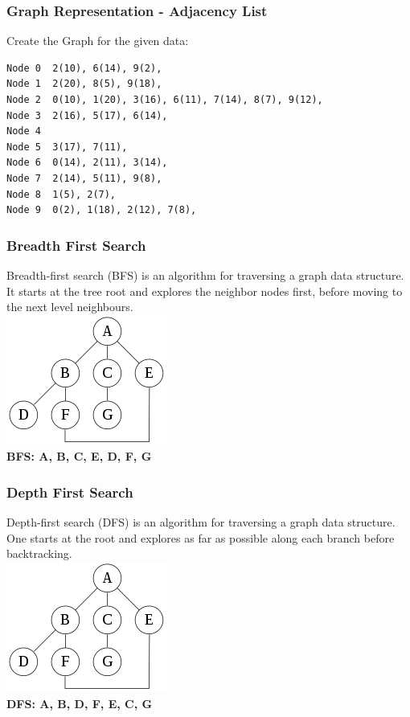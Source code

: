 \begin{frame}[fragile]
\frametitle{Graph Representation - Adjacency List}
\begin{exercise}
Create the Graph for the given data:\\
{\tiny
\begin{lstlisting}
Node 0	2(10), 6(14), 9(2), 
Node 1	2(20), 8(5), 9(18), 
Node 2	0(10), 1(20), 3(16), 6(11), 7(14), 8(7), 9(12), 
Node 3	2(16), 5(17), 6(14), 
Node 4	
Node 5	3(17), 7(11), 
Node 6	0(14), 2(11), 3(14), 
Node 7	2(14), 5(11), 9(8), 
Node 8	1(5), 2(7), 
Node 9	0(2), 1(18), 2(12), 7(8),
\end{lstlisting}
}
\end{exercise}
\end{frame}

\begin{frame}[fragile]
\frametitle{Breadth First Search}
Breadth-first search (BFS) is an algorithm for traversing a graph data structure. It starts at the tree root and explores the neighbor nodes first, before moving to the next level neighbours.\\
\vspace{3mm}
\includegraphics[scale=0.5]{img/graph2.png}\\
\vspace{3mm}
{\bf BFS: A, B, C, E, D, F, G}
\end{frame}

\begin{frame}[fragile]
\frametitle{Depth First Search}
Depth-first search (DFS) is an algorithm for traversing a graph data structure. One starts at the root and explores as far as possible along each branch before backtracking.\\
\vspace{3mm}
\includegraphics[scale=0.5]{img/graph2.png}\\
\vspace{3mm}
{\bf DFS: A, B, D, F, E, C, G}
\end{frame}

